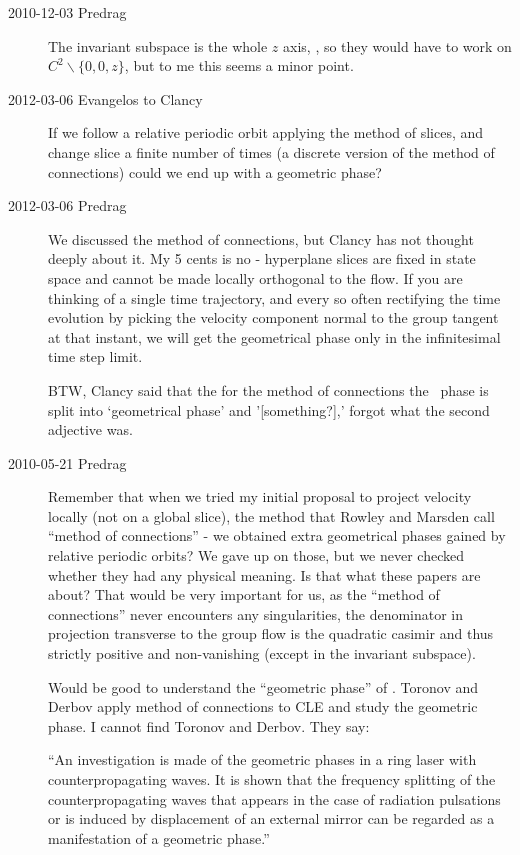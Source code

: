 \begin{description}
\item[2010-12-03  Predrag] The invariant subspace is the whole $z$ axis,
\ie, so they would have to work on $C^2\backslash \{0,0,z\}$, but to me
this seems a minor point.

\item[2012-03-06 Evangelos to Clancy]
If we follow a relative periodic orbit applying the method of slices, and
change slice a finite number of times (a discrete version of the method
of connections) could we end up with a geometric phase?

\item[2012-03-06 Predrag]
We discussed the method of connections, but Clancy has not thought deeply
about it.  My 5 cents is no - hyperplane slices are fixed in state space
and cannot be made locally orthogonal to the flow. If you are thinking of
a single time trajectory, and every so often rectifying the time
evolution by picking the velocity component normal to the group tangent
at that instant, we will get the geometrical phase only in the
infinitesimal time step limit.

BTW, Clancy said that the for the method of connections the \rpo\ phase
is split into `geometrical phase' and '[something?],'
 forgot what the second adjective was.

\item[2010-05-21 Predrag]
Remember that when we tried my initial proposal to project velocity
locally (not on a global slice), the method that Rowley and
Marsden call ``method of connections'' - we
obtained extra geometrical phases gained by relative periodic orbits? We
gave up on those, but we never checked whether they had any physical
meaning. Is that what these papers are about? That would be very
important for us, as the ``method of connections'' never encounters any
singularities, the denominator in projection transverse to the group flow
is the quadratic casimir and thus strictly positive and non-vanishing
(except in the invariant subspace).

Would be good to understand the ``geometric phase'' of
. Toronov and Derbov apply
method of connections to CLE and study the geometric phase. I cannot find
Toronov and Derbov. They say:

``An investigation is made of the geometric phases in a ring laser with
   counterpropagating waves. It is shown that the frequency splitting of
   the counterpropagating waves that appears in the case of radiation
   pulsations or is induced by displacement of an external mirror can be
   regarded as a manifestation of a geometric phase.''


\end{description}
